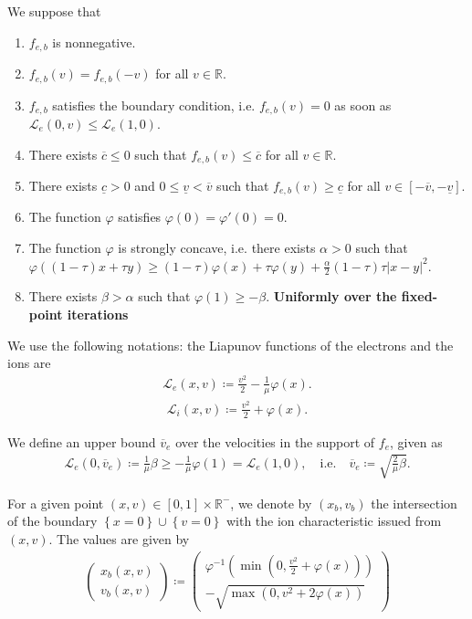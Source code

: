 \documentclass{article}
\numberwithin{equation}{section}
\newcommand{\todo}[1]{{\color{red}\textbf{#1}}}
\newcommand{\vv}[1]{\begin{pmatrix} #1 \end{pmatrix}} %
\newcommand{\ve}{{\overline{v}_e}} %
\newcommand{\domfel}{{\underline{v}}} %
\newcommand{\domfeu}{{\overline{v}}} %
\newcommand{\minfe}{{\underline{c}}} %
\newcommand{\maxfe}{{\overline{c}}} %
\begin{document}
We suppose that 
\begin{enumerate}
\item $f_{e,b}$ is nonnegative.
\item $f_{e,b}(v) = f_{e,b}(-v)$ for all $v\in\mathbb{R}$.
\item $f_{e,b}$ satisfies the boundary condition, i.e. $f_{e,b}(v) = 0$ as soon as $\mathcal{L}_e(0,v) \leqslant \mathcal{L}_e(1,0)$.
\item There exists $\maxfe \leqslant 0$ such that $f_{e,b}(v) \leqslant \maxfe$ for all $v \in \mathbb{R}$.
\item There exists $\minfe > 0$ and $0 \leqslant \domfel < \domfeu$ such that $f_{e,b}(v) \geqslant \minfe$ for all $v\in[-\domfeu,-\domfel]$.
\item The function $\varphi$ satisfies $\varphi(0)=\varphi'(0)=0$.
\item The function $\varphi$ is strongly concave, i.e. there exists $\alpha>0$ such that $\varphi((1-\tau) x + \tau y) \geqslant (1-\tau) \varphi(x)+\tau \varphi(y) + \frac{\alpha}{2} (1-\tau)\tau \left|x-y\right|^2$.
\item There exists $\beta > \alpha$ such that $\varphi(1) \geqslant - \beta$. \todo{Uniformly over the fixed-point iterations}
\end{enumerate}

We use the following notations: the Liapunov functions of the electrons and the ions are
\begin{align}\label{eq:def_Le}
	\mathcal{L}_e(x,v) \coloneqq \frac{v^2}{2} - \frac{1}{\mu} \varphi(x).
\end{align}
\begin{align}\label{eq:def_Li}
	\mathcal{L}_i(x,v) \coloneqq \frac{v^2}{2} + \varphi(x).
\end{align}

We define an upper bound $\ve$ over the velocities in the support of $f_e$, given as
\begin{align}\label{eq:def_ve}
	\mathcal{L}_e(0,\ve) \coloneqq \frac{1}{\mu} \beta \geqslant -\frac{1}{\mu}\varphi(1) = \mathcal{L}_e(1,0), \quad\text{i.e.}\quad \ve \coloneqq \sqrt{\frac{2}{\mu}\beta}.
\end{align}

For a given point $(x,v) \in [0,1]\times \mathbb{R}^{-}$, we denote by $(x_b, v_b)$ the intersection of the boundary $\left\{x=0\right\} \cup \left\{v=0\right\}$ with the ion characteristic issued from $(x,v)$. The values are given by
\begin{align}\label{eq:def_xb_vb}
	\vv{x_b(x,v) \\ v_b(x,v)} \coloneqq \vv{\varphi^{-1}\left(\min\left(0,\frac{v^2}{2} + \varphi(x)\right)\right) \\ - \sqrt{\max\left(0,v^2 + 2\varphi(x)\right)}}
\end{align}
\end{document}
